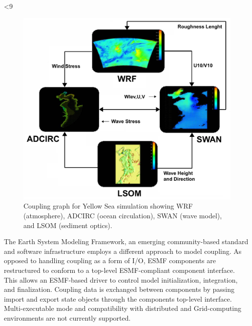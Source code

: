 %
%
\ifnum{}<9
\begin{figure} 
  \centering
  \includegraphics[width=6in]{figures/coupling.pdf}
  \caption{\label{figure:6}Coupling graph for Yellow Sea simulation showing WRF (atmosphere),
           ADCIRC (ocean circulation), SWAN (wave model), and LSOM (sediment optics).}
\end{figure}
\fi

The Earth System Modeling Framework, an emerging community-based standard 
and software infrastructure employs a different approach to model coupling. As 
opposed to handling coupling as a form of I/O, ESMF components are restructured 
to conform to a top-level ESMF-compliant component interface. This allows an 
ESMF-based driver to control model initialization, integration, and finalization. 
Coupling data is exchanged between components by passing import and export 
state objects through the components top-level interface.  Multi-executable mode
and compatibility with distributed and Grid-computing environments are
not currently supported.

